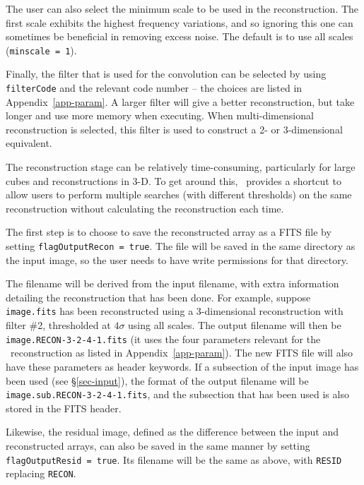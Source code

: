 The user can also select the minimum scale to be used in the
reconstruction. The first scale exhibits the highest frequency
variations, and so ignoring this one can sometimes be beneficial in
removing excess noise. The default is to use all scales
(\texttt{minscale = 1}).

Finally, the filter that is used for the convolution can be selected
by using \texttt{filterCode} and the relevant code number -- the
choices are listed in Appendix~\ref{app-param}. A larger filter will
give a better reconstruction, but take longer and use more memory when
executing. When multi-dimensional reconstruction is selected, this
filter is used to construct a 2- or 3-dimensional equivalent.

\label{sec-reconIO}

The reconstruction stage can be relatively time-consuming,
particularly for large cubes and reconstructions in 3-D. To get around
this, \duchamp\ provides a shortcut to allow users to perform multiple
searches (\eg with different thresholds) on the same reconstruction
without calculating the reconstruction each time.

The first step is to choose to save the reconstructed array as a FITS
file by setting \texttt{flagOutputRecon = true}. The file will be
saved in the same directory as the input image, so the user needs to
have write permissions for that directory.

The filename will be derived from the input filename, with extra
information detailing the reconstruction that has been done. For
example, suppose \texttt{image.fits} has been reconstructed using a
3-dimensional reconstruction with filter \#2, thresholded at $4\sigma$
using all scales. The output filename will then be
\texttt{image.RECON-3-2-4-1.fits} (\ie it uses the four parameters
relevant for the \atrous\ reconstruction as listed in
Appendix~\ref{app-param}). The new FITS file will also have these
parameters as header keywords. If a subsection of the input image has
been used (see \S\ref{sec-input}), the format of the output filename
will be \texttt{image.sub.RECON-3-2-4-1.fits}, and the subsection that
has been used is also stored in the FITS header.

Likewise, the residual image, defined as the difference between the
input and reconstructed arrays, can also be saved in the same manner
by setting \texttt{flagOutputResid = true}. Its filename will be the
same as above, with \texttt{RESID} replacing \texttt{RECON}.

